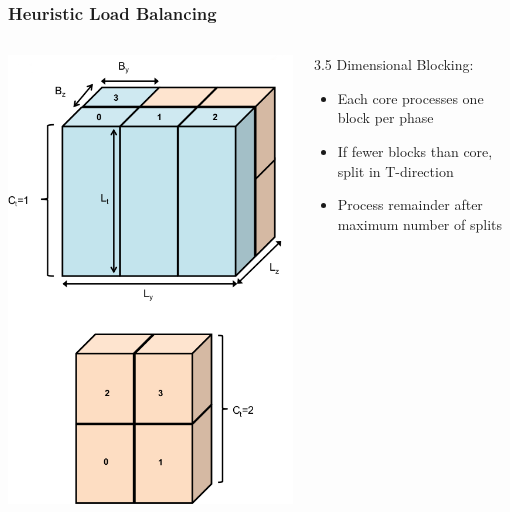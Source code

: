 \documentclass{beamer}
\begin{document}
  \begin{frame}
    \frametitle{Heuristic Load Balancing}


    \begin{columns}
      \begin{column}{.45\linewidth}
        \includegraphics[height=0.85\textheight]{phases-crop.png}
      \end{column}
      \begin{column}{.50\linewidth}
        3.5 Dimensional Blocking:

        \begin{itemize}
          \item Each core processes one block per phase
          \item If fewer blocks than core, split in T-direction
          \item Process remainder after maximum number of splits
        \end{itemize}
      \end{column}
    \end{columns}

  \end{frame}
\end{document}
